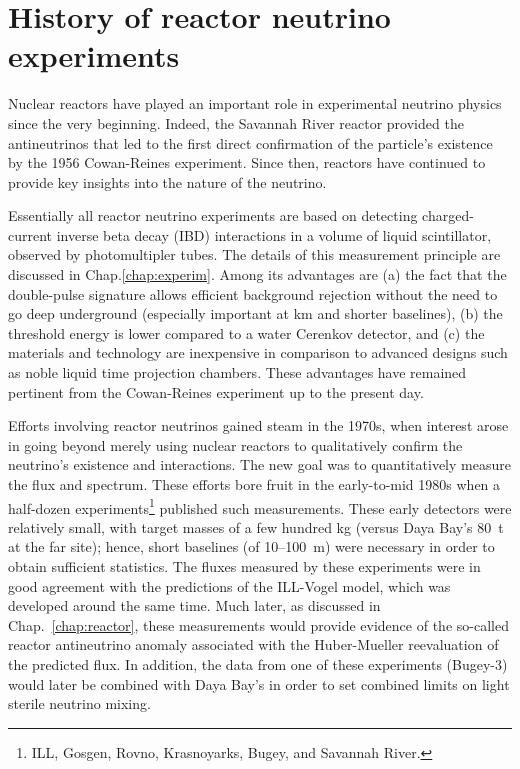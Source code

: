 \documentclass[../thesis.tex]{subfiles}
\begin{document}
\section{History of reactor neutrino experiments}
\label{sec:introReactor}

Nuclear reactors have played an important role in experimental neutrino physics since the very beginning. Indeed, the Savannah River reactor provided the antineutrinos that led to the first direct confirmation of the particle's existence by the 1956 Cowan-Reines experiment. Since then, reactors have continued to provide key insights into the nature of the neutrino.

Essentially all reactor neutrino experiments are based on detecting charged-current inverse beta decay (IBD) interactions in a volume of liquid scintillator, observed by photomultipler tubes. The details of this measurement principle are discussed in Chap.\ref{chap:experim}. Among its advantages are (a) the fact that the double-pulse signature allows efficient background rejection without the need to go deep underground (especially important at km and shorter baselines), (b) the threshold energy is lower compared to a water Cerenkov detector, and (c) the materials and technology are inexpensive in comparison to advanced designs such as noble liquid time projection chambers. These advantages have remained pertinent from the Cowan-Reines experiment up to the present day.

Efforts involving reactor neutrinos gained steam in the 1970s, when interest arose in going beyond merely using nuclear reactors to qualitatively confirm the neutrino's existence and interactions. The new goal was to quantitatively measure the flux and spectrum. These efforts bore fruit in the early-to-mid 1980s when a half-dozen experiments\footnote{ILL, Gosgen, Rovno, Krasnoyarks, Bugey, and Savannah River.} published such measurements. These early detectors were relatively small, with target masses of a few hundred kg (versus Daya Bay's 80~t at the far site); hence, short baselines (of 10--100~m) were necessary in order to obtain sufficient statistics. The fluxes measured by these experiments were in good agreement with the predictions of the ILL-Vogel model, which was developed around the same time. Much later, as discussed in Chap.~\ref{chap:reactor}, these measurements would provide evidence of the so-called reactor antineutrino anomaly associated with the Huber-Mueller reevaluation of the predicted flux. In addition, the data from one of these experiments (Bugey-3) would later be combined with Daya Bay's in order to set combined limits on light sterile neutrino mixing.
\end{document}
